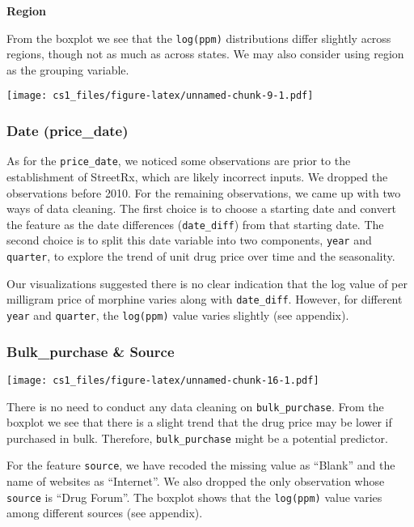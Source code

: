\documentclass[
  11pt,
]{article}
\begin{document}
\textbf{Region}

From the boxplot we see that the \texttt{log(ppm)} distributions differ
slightly across regions, though not as much as across states. We may
also consider using region as the grouping variable.

\texttt{[image: cs1\_files/figure-latex/unnamed-chunk-9-1.pdf]}

\hypertarget{date-price_date}{%
\subsubsection{Date (price\_date)}\label{date-price_date}}

As for the \texttt{price\_date}, we noticed some observations are prior
to the establishment of StreetRx, which are likely incorrect inputs. We
dropped the observations before 2010. For the remaining observations, we
came up with two ways of data cleaning. The first choice is to choose a
starting date and convert the feature as the date differences
(\texttt{date\_diff}) from that starting date. The second choice is to
split this date variable into two components, \texttt{year} and
\texttt{quarter}, to explore the trend of unit drug price over time and
the seasonality.

Our visualizations suggested there is no clear indication that the log
value of per milligram price of morphine varies along with
\texttt{date\_diff}. However, for different \texttt{year} and
\texttt{quarter}, the \texttt{log(ppm)} value varies slightly (see
appendix).

\hypertarget{bulk_purchase-source}{%
\subsubsection{Bulk\_purchase \& Source}\label{bulk_purchase-source}}

\texttt{[image: cs1\_files/figure-latex/unnamed-chunk-16-1.pdf]}

There is no need to conduct any data cleaning on
\texttt{bulk\_purchase}. From the boxplot we see that there is a slight
trend that the drug price may be lower if purchased in bulk. Therefore,
\texttt{bulk\_purchase} might be a potential predictor.

For the feature \texttt{source}, we have recoded the missing value as
``Blank'' and the name of websites as ``Internet''. We also dropped the
only observation whose \texttt{source} is ``Drug Forum''. The boxplot
shows that the \texttt{log(ppm)} value varies among different sources
(see appendix).
\end{document}
